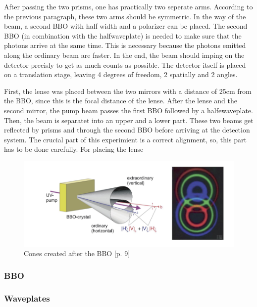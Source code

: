 \documentclass[12pt,a4paper]{article}
\begin{document}
\begin{multicols}{2}
 After passing the two prisms, one has practically two seperate arms. According to the previous paragraph, these two arms should be symmetric. In the way of the beam, a second BBO with half width and a polarizer can be placed. The second BBO (in combination with the halfwaveplate) is needed to make sure that the photons arrive at the same time. This is necessary because the photons emitted along the ordinary beam are faster. In the end, the beam should imping on the detector precisly to get as much counts as possible. The detector itself is placed on a translation stage, leaving 4 degrees of freedom, 2 spatially and 2 angles. 
 




First, the lense was placed between the two mirrors with a distance of 25cm from the BBO, since this is the focal distance of the lense. After the lense and the second mirror, the pump beam passes the first BBO followed by a halfewaveplate. Then, the beam is separatet into an upper and a lower part. These two beams get reflected by prisms and through the second BBO before arriving at the detection system.
The crucial part of this experimient is a correct alignment, so, this part has to be done carefully. 
For placing the lense
\begin{figure}[H]
 \centering
 \includegraphics[scale=0.7]{./figures/cones.png}
 \caption{Cones created after the BBO \cite{physikwiki}[p. 9]}
 \label{fig:cones}
\end{figure}

\subsubsection{BBO}
\subsubsection{Waveplates}

\end{multicols}
\end{document}

